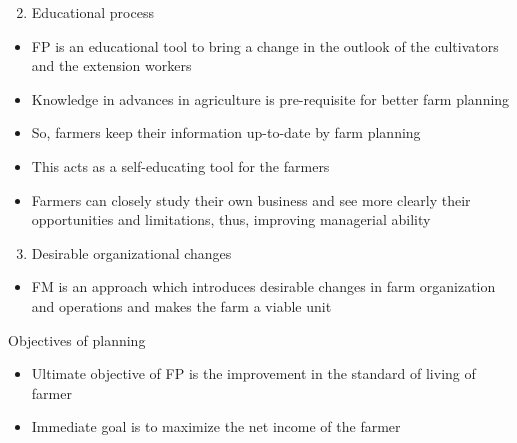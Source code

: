 \documentclass[12pt,ignorenonframetext,aspectratio=169]{beamer}
\providecommand{\tightlist}{%
  \setlength{\itemsep}{0pt}\setlength{\parskip}{0pt}}
\begin{document}
\begin{frame}{}
\protect\hypertarget{section}{}
\begin{enumerate}
\setcounter{enumi}{1}
\tightlist
\item
  Educational process
\end{enumerate}

\begin{itemize}
\tightlist
\item
  FP is an educational tool to bring a change in the outlook of the
  cultivators and the extension workers
\item
  Knowledge in advances in agriculture is pre-requisite for better farm
  planning
\item
  So, farmers keep their information up-to-date by farm planning
\item
  This acts as a self-educating tool for the farmers
\item
  Farmers can closely study their own business and see more clearly
  their opportunities and limitations, thus, improving managerial
  ability
\end{itemize}
\end{frame}

\begin{frame}{}
\protect\hypertarget{section-1}{}
\begin{enumerate}
\setcounter{enumi}{2}
\tightlist
\item
  Desirable organizational changes
\end{enumerate}

\begin{itemize}
\tightlist
\item
  FM is an approach which introduces desirable changes in farm
  organization and operations and makes the farm a viable unit
\end{itemize}
\end{frame}

\begin{frame}{Objectives of planning}
\protect\hypertarget{objectives-of-planning}{}
\begin{itemize}
\tightlist
\item
  Ultimate objective of FP is the improvement in the standard of living
  of farmer
\item
  Immediate goal is to maximize the net income of the farmer
\end{itemize}
\end{frame}
\end{document}
